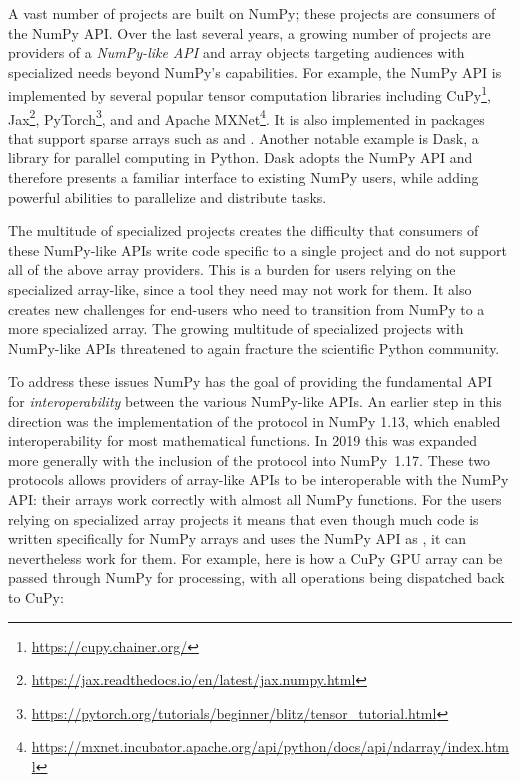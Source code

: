 A vast number of projects are built on NumPy;
these projects are consumers of the NumPy API.
Over the last several years, a growing number of projects are providers of
a \emph{NumPy-like API} and array objects targeting audiences with specialized
needs beyond NumPy's capabilities.
For example, the NumPy API is implemented by several popular tensor computation
libraries including CuPy\footnote{\url{https://cupy.chainer.org/}},
Jax\footnote{\url{https://jax.readthedocs.io/en/latest/jax.numpy.html}},
PyTorch\footnote{\url{https://pytorch.org/tutorials/beginner/blitz/tensor\_tutorial.html}}, and
and Apache MXNet\footnote{\url{https://mxnet.incubator.apache.org/api/python/docs/api/ndarray/index.html}}.
It is also implemented in packages that support sparse arrays
such as  and .
Another notable example is Dask, a library for parallel computing in
Python.  Dask adopts the NumPy API and therefore presents a familiar
interface to existing NumPy users, while adding powerful abilities to
parallelize and distribute tasks.

The multitude of specialized projects creates the difficulty that consumers
of these NumPy-like APIs write code specific to a single project and do not support
all of the above array providers.
This is a burden for users relying on the specialized array-like, since
a tool they need may not work for them.
It also creates new challenges for end-users who need to transition
from NumPy to a more specialized array.
The growing multitude of specialized projects with NumPy-like APIs threatened
to again fracture the scientific Python community.

To address these issues NumPy has the goal of providing the fundamental
API for \emph{interoperability} between the various NumPy-like APIs.
An earlier step in this direction was the implementation of the
 protocol in NumPy 1.13, which enabled interoperability
for most mathematical functions.\cite{NEP13}
In 2019 this was expanded more generally with the inclusion of the
 protocol into NumPy~1.17.
These two protocols allows providers of array-like APIs to be interoperable
with the NumPy API: their arrays work correctly with almost all NumPy functions.\cite{NEP18}
For the users relying on specialized array projects it means that even though
much code is written specifically for NumPy arrays and uses the NumPy API as
, it can nevertheless work for them.  For
example, here is how a CuPy GPU array can be passed through NumPy for
processing, with all operations being dispatched back to CuPy:

